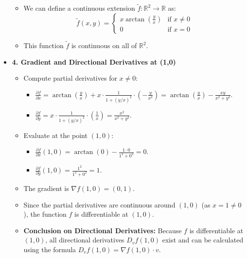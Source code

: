 \begin{cascade}
\begin{itemize}
\begin{itemize}
			      \item We can define a continuous extension $\tilde{f}: \mathbb{R}^2 \to \mathbb{R}$ as:
			            $$ \tilde{f}(x,y) = \begin{cases} x \arctan(\frac{y}{x}) & \text{if } x \neq 0 \\ 0 & \text{if } x = 0 \end{cases} $$
			      \item This function $\tilde{f}$ is continuous on all of $\mathbb{R}^2$.
		      \end{itemize}
		\item \textbf{4. Gradient and Directional Derivatives at (1,0)}
		      \begin{itemize}
			      \item Compute partial derivatives for $x \neq 0$:
			            \begin{itemize}
				            \item $\frac{\partial f}{\partial x} = \arctan\left(\frac{y}{x}\right) + x \cdot \frac{1}{1+(y/x)^2} \cdot \left(-\frac{y}{x^2}\right) = \arctan\left(\frac{y}{x}\right) - \frac{xy}{x^2+y^2}$.
				            \item $\frac{\partial f}{\partial y} = x \cdot \frac{1}{1+(y/x)^2} \cdot \left(\frac{1}{x}\right) = \frac{x^2}{x^2+y^2}$.
			            \end{itemize}
			      \item Evaluate at the point $(1,0)$:
			            \begin{itemize}
				            \item $\frac{\partial f}{\partial x}(1,0) = \arctan(0) - \frac{1 \cdot 0}{1^2+0^2} = 0$.
				            \item $\frac{\partial f}{\partial y}(1,0) = \frac{1^2}{1^2+0^2} = 1$.
			            \end{itemize}
			      \item The gradient is $\nabla f(1,0) = (0, 1)$.
			      \item Since the partial derivatives are continuous around $(1,0)$ (as $x=1 \neq 0$), the function $f$ is differentiable at $(1,0)$.
			      \item \textbf{Conclusion on Directional Derivatives:} Because $f$ is differentiable at $(1,0)$, all directional derivatives $D_v f(1,0)$ exist and can be calculated using the formula $D_v f(1,0) = \nabla f(1,0) \cdot v$.
		      \end{itemize}
	\end{itemize}
\end{cascade}

